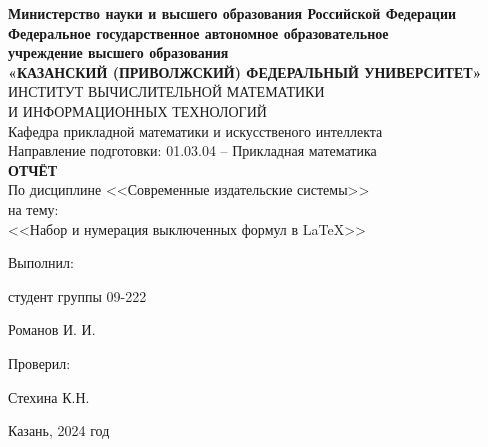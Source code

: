\documentclass[a4paper,12pt]{article}
\begin{document}
\begin{center}
\hfill \break
\textbf{\large{Министерство науки и высшего образования Российской Федерации\\
Федеральное государственное автономное образовательное\\
учреждение высшего образования}}
\\
\large{\textbf{«КАЗАНСКИЙ (ПРИВОЛЖСКИЙ) ФЕДЕРАЛЬНЫЙ УНИВЕРСИТЕТ»}}\\
\hfill \break
\large{ИНСТИТУТ ВЫЧИСЛИТЕЛЬНОЙ МАТЕМАТИКИ\\ И ИНФОРМАЦИОННЫХ ТЕХНОЛОГИЙ}\\
\hfill \break
\large{Кафедра прикладной математики и искусственого интеллекта}\\
\hfill\break
\hfill \break
\large{Направление подготовки: 01.03.04 – Прикладная математика}\\
\hfill \break
\hfill \break
\textbf{\large{ОТЧЁТ}}\\
\large{По дисциплине <<Современные издательские системы>>}\\
\large{на тему:}\\
\large{<<Набор и нумерация выключенных формул в \LaTeX>>}\\
\hfill \break
\hfill \break
\end{center}

\hfill \break
\begin{flushright}
			
    \large{Выполнил:}
    
    \large{студент группы 09-222}
    
    \large{Романов И. И.}
    
    \large{Проверил:}
    
    \large{Стехина К.Н.}
    
\end{flushright}
\vfill
\begin{center} \large{Казань, 2024 год} \end{center}
\thispagestyle{empty}
\end{document}
